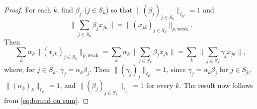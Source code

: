 \documentclass{amsart}
\theoremstyle{plain}
\theoremstyle{definition}
\numberwithin{equation}{section}
\begin{document}
\begin{proof}
For each $k$, find $\beta_j$ ($j \in S_k$) so that $\|(\beta_j)_{j \in S_k}\|_{\ell_{p'}} = 1$ and 
$$
\| \sum_{j \in S_k} \beta_j x_{jk} \| = \| (x_{jk})_{j \in S_k} \|_{p, \textrm{weak}} .
$$
Then
$$
\sum_k \alpha_k \| (x_{jk})_{j \in S_k} \|_{p, \textrm{weak}} = \sum_k \alpha_k \| \sum_{j \in S_k} \beta_j x_{jk} \| = \sum_k \| \sum_{j \in S_k} \gamma_j x_{jk} \| ,
$$
where, for $j \in S_k$, $\gamma_j = \alpha_k \beta_j$. Then 
$\|(\gamma_j)_j\|_{\ell_{p'}} = 1$, since $\gamma_j = \alpha_k \beta_j$ for $j \in S_k$, $\|(\alpha_k)_k\|_{\ell_{p'}} = 1$, and $\|(\beta_j)_{j \in S_k}\|_{\ell_{p'}} = 1$ for every $k$. The result now follows from \eqref{eq:bound on sum}.

\end{proof}
\end{document}
